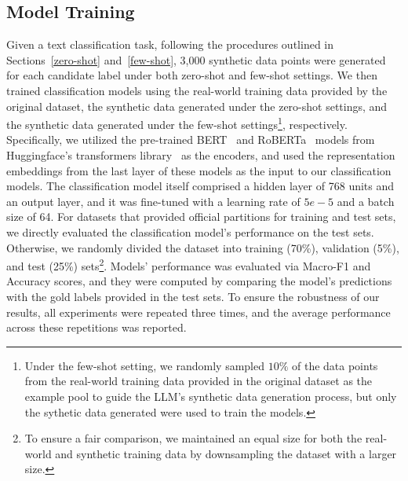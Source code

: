 \subsection{Model Training}
Given a text classification task, following the procedures outlined in Sections~\ref{zero-shot} and~\ref{few-shot}, 3,000 synthetic data points were generated for each candidate label under both zero-shot and few-shot settings. 
We then trained classification models using the real-world training data provided by the original dataset, the synthetic data generated under the zero-shot settings, and the synthetic data generated under the few-shot settings\footnote{Under the few-shot setting, we randomly sampled $10\%$ of the data points from the real-world training data provided in the original dataset as the example pool to guide the LLM's synthetic data generation process, but only the sythetic data generated were used to train the models.}, respectively. 
Specifically, we utilized the pre-trained BERT~\cite{devlin2018bert} and RoBERTa~\cite{liu2019roberta} models from Huggingface's transformers library~\cite{wolf-etal-2020-transformers} as the encoders, and used the representation embeddings from the last layer of these models as the input to our classification models. The classification model itself comprised a hidden layer of 768 units and an output layer, and it was fine-tuned with a learning rate of $5e-5$ and a batch size of 64. For datasets that provided official partitions for training and test sets, we directly evaluated the classification model's performance on the test sets. Otherwise, we randomly divided the dataset into training (70\%), validation (5\%), and test (25\%) sets\footnote{To ensure a fair comparison, we maintained an equal size for both the real-world and synthetic training data by downsampling the dataset with a larger size. 

}.  
Models' performance was evaluated via Macro-F1 and Accuracy scores, and they were computed by comparing the model's predictions with the gold labels provided in the test sets. 
To ensure the robustness of our results, all experiments were repeated three times, and the average performance across these repetitions was reported. 


